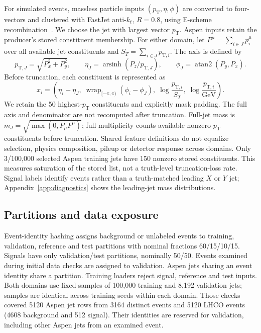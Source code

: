 \documentclass[11pt,a4paper]{article}
\newcommand{\pt}{p_{\mathrm T}}
\begin{document}
For simulated events, massless particle inputs $(\pt,\eta,\phi)$ are converted to
four-vectors and clustered with FastJet anti-$k_t$, $R=0.8$, using E-scheme
recombination~\cite{antikt,fastjet}. We choose the jet with largest vector $\pt$.
Aspen inputs retain the producer's stored constituent membership. For either
domain, let $P^\mu=\sum_{i\in J}p_i^\mu$ over all available jet constituents and
$S_T=\sum_{i\in J}p_{\mathrm T,i}$. The axis is defined by
\begin{equation}
 p_{\mathrm T,J}=\sqrt{P_x^2+P_y^2},\qquad
 \eta_J=\operatorname{arsinh}(P_z/p_{\mathrm T,J}),\qquad
 \phi_J=\operatorname{atan2}(P_y,P_x).
\end{equation}
Before truncation, each constituent is represented as
\begin{equation}\label{eq:features}
 x_i=\left(\eta_i-\eta_J,\;\operatorname{wrap}_{[-\pi,\pi)}(\phi_i-\phi_J),\;
 \log\frac{p_{\mathrm T,i}}{S_T},\;\log\frac{p_{\mathrm T,i}}{\mathrm{GeV}}\right).
\end{equation}
We retain the 50 highest-$\pt$ constituents and explicitly mask padding.
The full axis and denominator are not recomputed after truncation. Full-jet mass
is $m_J=\sqrt{\max(0,P_\mu P^\mu)}$; full multiplicity counts available nonzero-$\pt$
constituents before truncation. Shared feature definitions do not equalize
selection, physics composition, pileup or detector response across domains.
Only 3/100,000 selected Aspen training jets have 150 nonzero stored constituents.
This measures saturation of the stored list, not a truth-level truncation-loss
rate. Signal labels identify events rather than a truth-matched leading $X$ or
$Y$ jet; Appendix~\ref{app:diagnostics} shows the leading-jet mass distributions.

\subsection{Partitions and data exposure}
Event-identity hashing assigns background or unlabeled events to training,
validation, reference and test partitions with nominal fractions 60/15/10/15.
Signals have only validation/test partitions, nominally 50/50. Events examined
during initial data checks are assigned to validation. Aspen jets sharing an
event identity share a partition. Training loaders reject signal, reference and
test inputs. Both domains use fixed samples of 100,000 training and 8,192 validation
jets; samples are identical across training seeds within each domain.
Those checks covered 5120 Aspen jet rows from 3164 distinct events and 5120 LHCO
events (4608 background and 512 signal). Their identities are reserved for
validation, including other Aspen jets from an examined event.
\end{document}
